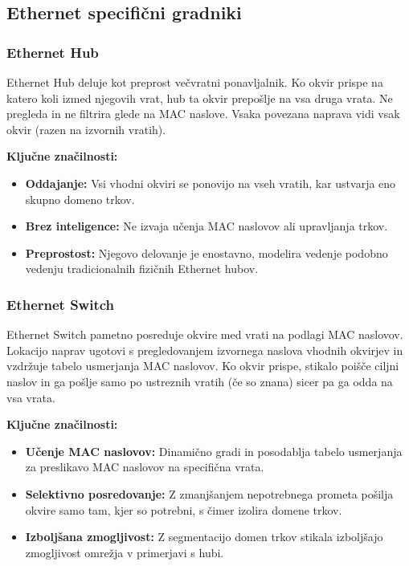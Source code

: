 \subsection{Ethernet specifični gradniki}
\subsubsection{Ethernet Hub}
Ethernet Hub deluje kot preprost večvratni ponavljalnik. Ko okvir prispe na katero koli izmed njegovih vrat, hub ta okvir prepošlje na vsa druga vrata. Ne pregleda in ne filtrira glede na MAC naslove. Vsaka povezana naprava vidi vsak okvir (razen na izvornih vratih).

\vspace{1em}
\noindent\begin{minipage}{\linewidth}
    \textbf{Ključne značilnosti:}
    \begin{itemize}
        \item \textbf{Oddajanje:} Vsi vhodni okviri se ponovijo na vseh vratih, kar ustvarja eno skupno domeno trkov.
        \item \textbf{Brez inteligence:} Ne izvaja učenja MAC naslovov ali upravljanja trkov.
        \item \textbf{Preprostost:} Njegovo delovanje je enostavno, modelira vedenje podobno vedenju tradicionalnih fizičnih Ethernet hubov.
    \end{itemize}

\end{minipage}

\subsubsection{Ethernet Switch}
Ethernet Switch pametno posreduje okvire med vrati na podlagi MAC naslovov. Lokacijo naprav ugotovi s pregledovanjem izvornega naslova vhodnih okvirjev in vzdržuje tabelo usmerjanja MAC naslovov. Ko okvir prispe, stikalo poišče ciljni naslov in ga pošlje samo po ustreznih vratih (če so znana) sicer pa ga odda na vsa vrata.

\vspace{1em}
\noindent\begin{minipage}{\linewidth}
    \textbf{Ključne značilnosti:}
    \begin{itemize}
        \item \textbf{Učenje MAC naslovov:} Dinamično gradi in posodablja tabelo usmerjanja za preslikavo MAC naslovov na specifična vrata.
        \item \textbf{Selektivno posredovanje:} Z zmanjšanjem nepotrebnega prometa pošilja okvire samo tam, kjer so potrebni, s čimer izolira domene trkov.
        \item \textbf{Izboljšana zmogljivost:} Z segmentacijo domen trkov stikala izboljšajo zmogljivost omrežja v primerjavi s hubi.
    \end{itemize}
\end{minipage}

